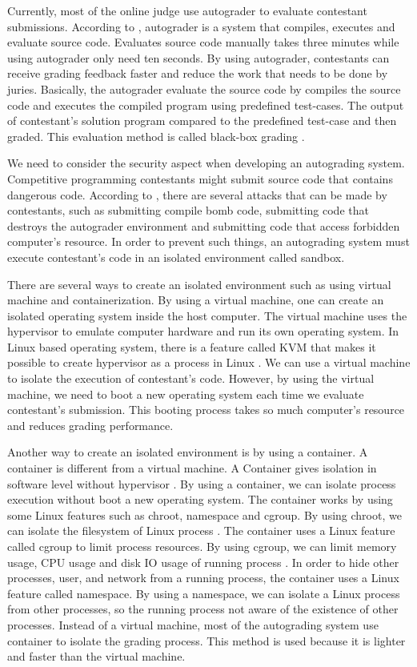 \documentclass[conference,a4paper]{IEEEtran}
\begin{document}
Currently, most of the online judge use autograder to evaluate contestant submissions. According to \cite{danutamalms}, autograder is a system that compiles, executes and evaluate source code. Evaluates source code manually takes three minutes while using autograder only need ten seconds. By using autograder, contestants can receive grading feedback faster and reduce the work that needs to be done by juries. Basically, the autograder evaluate the source code by compiles the source code and executes the compiled program using predefined test-cases. The output of contestant's solution program compared to the predefined test-case and then graded. This evaluation method is called black-box grading \cite{jordanioi}.

We need to consider the security aspect when developing an autograding system. Competitive programming contestants might submit source code that contains dangerous code. According to \cite{wasikojsurvey}, there are several attacks that can be made by contestants, such as submitting compile bomb code, submitting code that destroys the autograder environment and submitting code that access forbidden computer's resource. In order to prevent such things, an autograding system must execute contestant's code in an isolated environment called sandbox.

There are several ways to create an isolated environment such as using virtual machine and containerization. By using a virtual machine, one can create an isolated operating system inside the host computer. The virtual machine uses the hypervisor to emulate computer hardware and run its own operating system. In Linux based operating system, there is a feature called KVM that makes it possible to create hypervisor as a process in Linux \cite{wfeltervmcontainer}. We can use a virtual machine to isolate the execution of contestant's code. However, by using the virtual machine, we need to boot a new operating system each time we evaluate contestant's submission. This booting process takes so much computer's resource and reduces grading performance.

Another way to create an isolated environment is by using a container. A container is different from a virtual machine. A Container gives isolation in software level without hypervisor \cite{merkeldocker}. By using a container, we can isolate process execution without boot a new operating system. The container works by using some Linux features such as chroot, namespace and cgroup. By using chroot, we can isolate the filesystem of Linux process \cite{lessardchroot}. The container uses a Linux feature called cgroup to limit process resources. By using cgroup, we can limit memory usage, CPU usage and disk IO usage of running process \cite{wfeltervmcontainer}. In order to hide other processes, user, and network from a running process, the container uses a Linux feature called namespace. By using a namespace, we can isolate a Linux process from other processes, so the running process not aware of the existence of other processes. Instead of a virtual machine, most of the autograding system use container to isolate the grading process. This method is used because it is lighter and faster than the virtual machine. 
\end{document}
